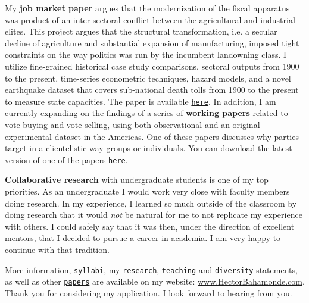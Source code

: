 \documentclass[10pt,stdletter,dateno,sigleft]{newlfm} %
\begin{document}
\begin{newlfm}
My {\bf job market paper} argues that the modernization of the fiscal apparatus was product of an inter-sectoral conflict between the agricultural and industrial elites. This project argues that the structural transformation, i.e. a secular decline of agriculture and substantial expansion of manufacturing, imposed tight constraints on the way politics was run by the incumbent landowning class. I utilize fine-grained historical case study comparisons, sectoral outputs from 1900 to the present, time-series econometric techniques, hazard models, and a novel earthquake dataset that covers sub-national death tolls from 1900 to the present to measure state capacities. The paper is available \href{https://github.com/hbahamonde/IncomeTaxAdoption/raw/master/Bahamonde_IncomeTaxAdoption.pdf}{\texttt{here}}. In addition, I am currently expanding on the findings of a series of {\bf working papers} related to vote-buying and vote-selling, using both observational and an original experimental dataset in the Americas. One of these papers discusses why parties target in a clientelistic way groups or individuals. You can download the latest version of one of the papers \href{https://github.com/hbahamonde/Clientelism_paper/raw/master/Bahamonde_Clientelism_Paper.pdf}{\texttt{here}}. 


{\bf Collaborative research} with undergraduate students is one of my top priorities. As an undergraduate I would work very close with faculty members doing research. In my experience, I learned so much outside of the classroom by doing research that it would \emph{not} be natural for me to not replicate my experience with others. I could safely say that it was then, under the direction of excellent mentors, that I decided to pursue a career in academia. I am very happy to continue with that tradition.


More information, \href{http://www.hectorbahamonde.com/teaching/
}{\texttt{syllabi}}, my \href{http://github.com/hbahamonde/Job_Market/raw/master/Bahamonde_Research_Statement.pdf}{\texttt{research}}, \href{http://github.com/hbahamonde/Job_Market/raw/master/Bahamonde_Teaching_Statement.pdf}{\texttt{teaching}} and \href{http://github.com/hbahamonde/Job_Market/raw/master/Bahamonde_Diversity_Statement.pdf}{\texttt{diversity}} statements, as well as other \href{http://www.hectorbahamonde.com/research/}{\texttt{papers}} are available on my website: \href{http://www.hectorbahamonde.com}{www.HectorBahamonde.com}. Thank you for considering my application. I look forward to hearing from you.






\end{newlfm}
\end{document}
